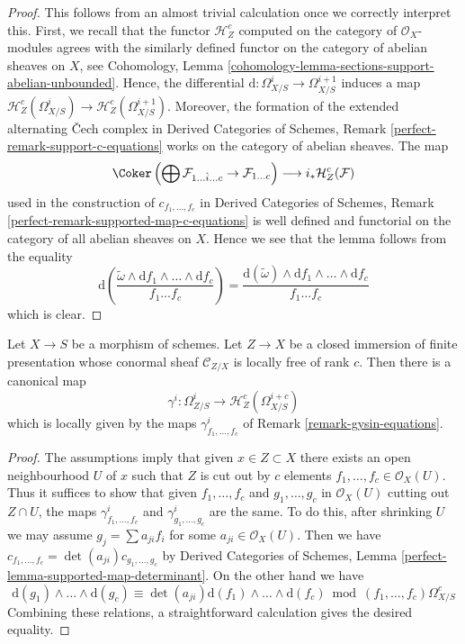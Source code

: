 \begin{proof}
This follows from an almost trivial calculation once
we correctly interpret this. First, we recall that the functor
$\mathcal{H}^c_Z$ computed on the category of $\mathcal{O}_X$-modules
agrees with the similarly defined functor on the category of abelian
sheaves on $X$, see
Cohomology, Lemma \ref{cohomology-lemma-sections-support-abelian-unbounded}.
Hence, the differential $\text{d} : \Omega^i_{X/S} \to \Omega^{i + 1}_{X/S}$
induces a map
$\mathcal{H}^c_Z(\Omega^i_{X/S}) \to \mathcal{H}^c_Z(\Omega^{i + 1}_{X/S})$.
Moreover, the formation of the extended alternating {\v C}ech complex in
Derived Categories of Schemes, Remark \ref{perfect-remark-support-c-equations}
works on the category of abelian sheaves. The map
$$
\Coker\left(\bigoplus \mathcal{F}_{1 \ldots \hat i \ldots c} \to
\mathcal{F}_{1 \ldots c}\right)
\longrightarrow
i_*\mathcal{H}^c_Z(\mathcal{F})
$$
used in the construction of $c_{f_1, \ldots, f_c}$ in
Derived Categories of Schemes, Remark
\ref{perfect-remark-supported-map-c-equations}
is well defined and
functorial on the category of all abelian sheaves on $X$.
Hence we see that the lemma follows from the equality
$$
\text{d}\left(
\frac{\tilde \omega \wedge \text{d}f_1 \wedge \ldots \wedge
\text{d}f_c}{f_1 \ldots f_c}\right) =
\frac{\text{d}(\tilde \omega) \wedge
\text{d}f_1 \wedge \ldots \wedge \text{d}f_c}{f_1 \ldots f_c}
$$
which is clear.
\end{proof}

\begin{lemma}
\label{lemma-gysin-global}
Let $X \to S$ be a morphism of schemes. Let $Z \to X$ be a closed immersion
of finite presentation whose conormal sheaf $\mathcal{C}_{Z/X}$ is
locally free of rank $c$. Then there is a canonical map
$$
\gamma^i : \Omega^i_{Z/S} \to \mathcal{H}^c_Z(\Omega^{i + c}_{X/S})
$$
which is locally given by the maps $\gamma^i_{f_1, \ldots, f_c}$
of Remark \ref{remark-gysin-equations}.
\end{lemma}

\begin{proof}
The assumptions imply that given $x \in Z \subset X$ there exists an
open neighbourhood $U$ of $x$ such that $Z$ is cut out by $c$
elements $f_1, \ldots, f_c \in \mathcal{O}_X(U)$. Thus
it suffices to show that given $f_1, \ldots, f_c$ and
$g_1, \ldots, g_c$ in $\mathcal{O}_X(U)$ cutting out $Z \cap U$,
the maps $\gamma^i_{f_1, \ldots, f_c}$
and $\gamma^i_{g_1, \ldots, g_c}$ are the same. To do this, after shrinking
$U$ we may assume $g_j = \sum a_{ji} f_i$ for some
$a_{ji} \in \mathcal{O}_X(U)$. Then we have
$c_{f_1, \ldots, f_c} = \det(a_{ji}) c_{g_1, \ldots, g_c}$ by
Derived Categories of Schemes, Lemma
\ref{perfect-lemma-supported-map-determinant}.
On the other hand we have
$$
\text{d}(g_1) \wedge \ldots \wedge \text{d}(g_c) \equiv
\det(a_{ji}) \text{d}(f_1) \wedge \ldots \wedge \text{d}(f_c)
\bmod (f_1, \ldots, f_c)\Omega^c_{X/S}
$$
Combining these relations, a straightforward calculation gives the
desired equality.
\end{proof}

